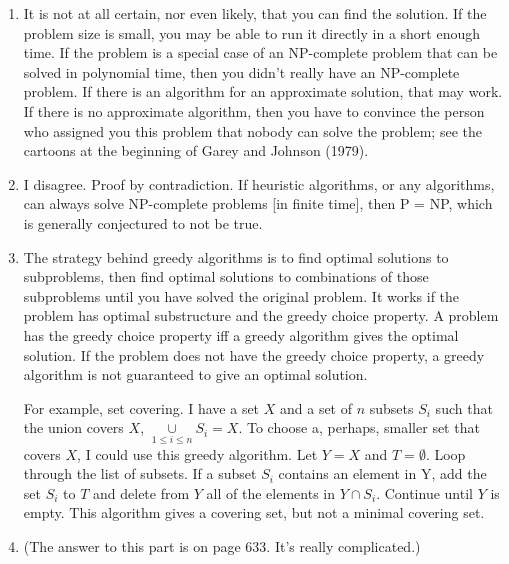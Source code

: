 \begin{enumerate}
	\item It is not at all certain, nor even likely, that you can find the solution.  If the problem size is small, you may be able to run it directly in a short enough time.  If the problem is a special case of an NP-complete problem that can be solved in polynomial time, then you didn't really have an NP-complete problem.  If there is an algorithm for an approximate solution, that may work.  If there is no approximate algorithm, then you have to convince the person who assigned you this problem that nobody can solve the problem; see the cartoons at the beginning of Garey and Johnson (1979).
	\item I disagree.  Proof by contradiction.  If heuristic algorithms, or any algorithms, can always solve NP-complete problems [in finite time], then P = NP, which is generally conjectured to not be true.  
	
	\item The strategy behind greedy algorithms is to find optimal solutions to subproblems, then find optimal solutions to combinations of those subproblems until you have solved the original problem.  It works if the problem has optimal substructure and the greedy choice property.  A problem has the greedy choice property iff a greedy algorithm gives the optimal solution.  If the problem does not have the greedy choice property, a greedy algorithm is not guaranteed to give an optimal solution.  
	
	For example, set covering.  I have a set $X$ and a set of $n$ subsets $S_i$ such that the union covers $X$,  $\displaystyle\underset{1 \le i \le n}{\cup}S_i = X$.  To choose a, perhaps, smaller set that covers $X$, I could use this greedy algorithm.  Let $Y=X$ and $T = \emptyset$.  Loop through the list of subsets.  If a subset $S_i$ contains an element in Y, add the set $S_i$ to $T$ and delete from $Y$ all of the elements in $Y \cap S_i$.  Continue until $Y$ is empty.  This algorithm gives a covering set, but not a minimal covering set.  
	
	\item (The answer to this part is on page 633.  It's really complicated.)
\end{enumerate}







